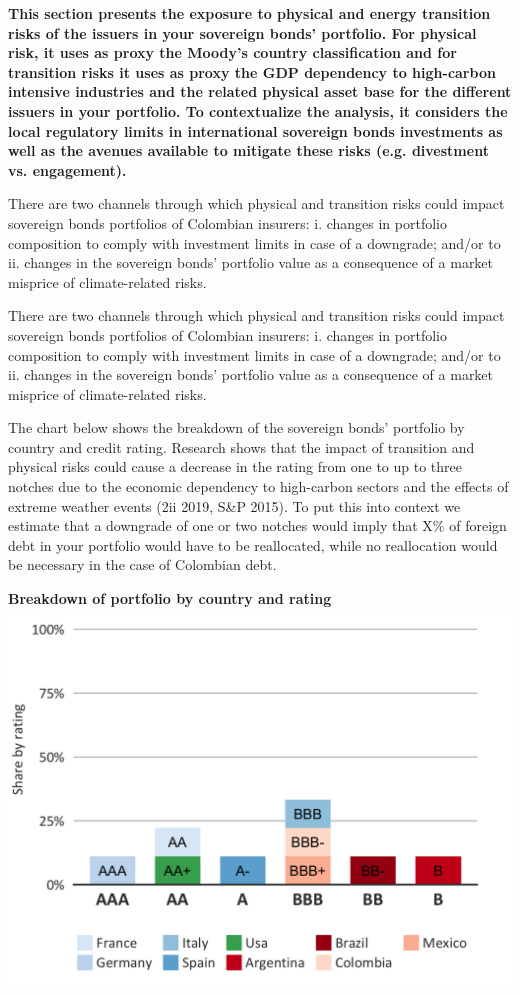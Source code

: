 \documentclass[10pt,table,a4]{article}\usepackage[]{graphicx}\usepackage[]{color}
\begin{document}
	\begin{multicols}{2}
		
		\textbf{This section presents the exposure to physical and energy transition risks of the issuers in your sovereign bonds’ portfolio. For physical risk, it uses as proxy the Moody’s country classification and for transition risks it uses as proxy the GDP dependency to high-carbon intensive industries and the related physical asset base for the different issuers in your portfolio. To contextualize the analysis, it considers the local regulatory limits in international sovereign bonds investments as well as the avenues available to mitigate these risks (e.g. divestment vs. engagement).}
		
		There are two channels through which physical and transition risks could impact sovereign bonds portfolios of Colombian insurers: i. changes in portfolio composition to comply with investment limits in case of a downgrade; and/or to ii. changes in the sovereign bonds’ portfolio value as a consequence of a market misprice of climate-related risks. 
		
		
		There are two channels through which physical and transition risks could impact sovereign bonds portfolios of Colombian insurers: i. changes in portfolio composition to comply with investment limits in case of a downgrade; and/or to ii. changes in the sovereign bonds’ portfolio value as a consequence of a market misprice of climate-related risks. 
		
		The chart below shows the breakdown of the sovereign bonds’ portfolio by country and credit rating. Research shows that the impact of transition and physical risks could cause a decrease in the rating from one to up to three notches due to the economic dependency to high-carbon sectors and the effects of extreme weather events (2ii 2019, S\&P 2015). To put this into context we estimate that a downgrade of one or two notches would imply that X\% of foreign debt in your portfolio would have to be reallocated, while no reallocation would be necessary in the case of Colombian debt.  
		
		
		\textbf{Breakdown of portfolio by country and rating}\\
		\includegraphics[trim = {0, 0, 0, 0cm},width=1\linewidth]{ReportOutputs/Fig1_2sb}
		

\end{multicols}
\end{document}
